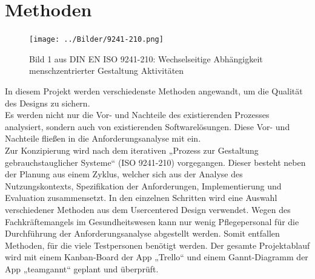 \documentclass[a4paper, ngerman, 12pt]{scrartcl}
\begin{document}
\section{Methoden}
\begin{figure}[h]
	\centering
	\texttt{[image: ../Bilder/9241-210.png]}
	\caption{Bild 1 aus DIN EN ISO 9241-210: Wechselseitige Abhängigkeit menschzentrierter Gestaltung Aktivitäten}
	\label{img:9241-210}
\end{figure}
In diesem Projekt werden verschiedenste Methoden angewandt, um die Qualität des Designs zu sichern.\\

Es werden nicht nur die Vor- und Nachteile des existierenden Prozesses analysiert, sondern auch von existierenden Softwarelösungen. Diese Vor- und Nachteile fließen in die Anforderungsanalyse mit ein.\\

Zur Konzipierung wird nach dem iterativen „Prozess zur Gestaltung gebrauchstauglicher Systeme“ (ISO 9241-210) vorgegangen. Dieser besteht neben der Planung aus einem Zyklus, welcher sich aus der Analyse des Nutzungskontexts, Spezifikation der Anforderungen, Implementierung und Evaluation zusammensetzt. In den einzelnen Schritten wird eine Auswahl verschiedener Methoden aus dem Usercentered Design verwendet. Wegen des Fachkräftemangels im Gesundheitswesen kann nur wenig Pflegepersonal für die Durchführung der Anforderungsanalyse abgestellt werden. Somit entfallen Methoden, für die viele Testpersonen benötigt werden. Der gesamte Projektablauf wird mit einem Kanban-Board der App „Trello“ und einem Gannt-Diagramm der App „teamgannt“ geplant und überprüft.\\

\begin{minipage}{\textwidth}
	\centering
		
		\label{img:projektplan1}
\end{minipage}\\[0.5em]

\begin{minipage}{\textwidth}
	\centering
	
	\label{img:projektplan2}
\end{minipage}\\[0.5em]

\begin{minipage}{\textwidth}
	\centering
	
	\label{img:arbeitsaufteilung}
\end{minipage}\\[0.5em]
\end{document}
